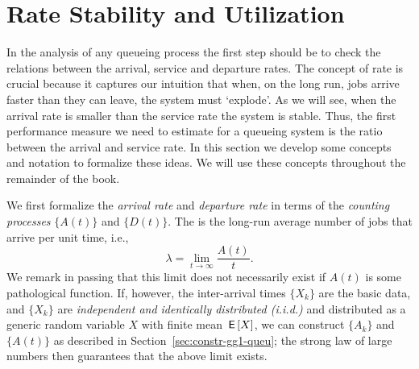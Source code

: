 \section{Rate Stability and Utilization}
\label{sec:rate-stability}



In the analysis of any queueing process the first step should be to check the relations between the arrival, service and departure rates.
The concept of rate is crucial because it captures our intuition that when, on the long run, jobs arrive faster than they can leave, the system must `explode'.
As we will see, when the arrival rate is smaller than the service rate the system is stable.
Thus, the first performance measure we need to estimate for a queueing system is the ratio between the arrival and service rate.
In this section we develop some concepts and notation to formalize these ideas.
We will use these concepts throughout the remainder of the book.

We first formalize the \emph{arrival rate} and \emph{departure rate} in terms of the \emph{counting processes} $\{A(t)\}$ and $\{D(t)\}$.
The  is the long-run average number of jobs that arrive per unit time, i.e.,
\begin{equation}
  \label{eq:3}
  \lambda = \lim_{t\to\infty} \frac{A(t)}t.
\end{equation}
We remark in passing that this limit does not necessarily exist if $A(t)$ is some pathological function.
If, however, the inter-arrival times $\{X_k\}$ are the basic data, and $\{X_k\}$ are \emph{independent and identically distributed (i.i.d.)}
and distributed as a generic random variable $X$ with finite mean $\,\mathsf{E}\left[X\right]$, we can construct $\{A_k\}$ and $\{A(t)\}$ as described in Section~\ref{sec:constr-gg1-queu}; the strong law of large numbers then guarantees that the above limit exists.

